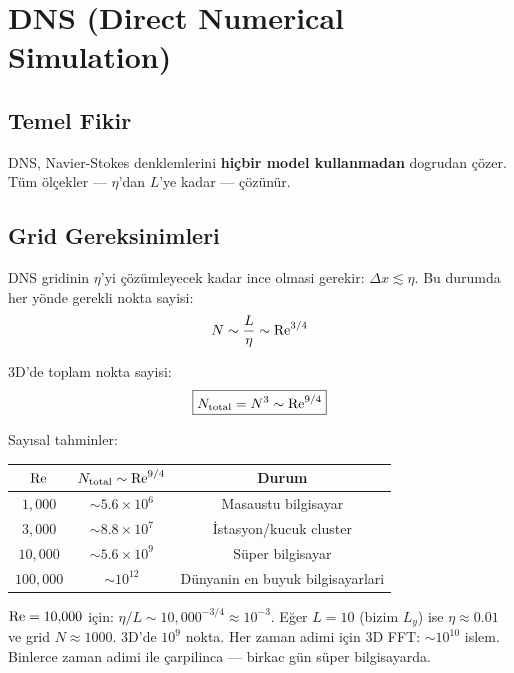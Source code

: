 \section{DNS (Direct Numerical Simulation)}
\label{sec:dns}

\subsection{Temel Fikir}

DNS, Navier-Stokes denklemlerini \textbf{hiçbir model kullanmadan} dogrudan çözer. Tüm ölçekler --- $\eta$'dan $L$'ye kadar --- çözünür.

\subsection{Grid Gereksinimleri}

DNS gridinin $\eta$'yi çözümleyecek kadar ince olmasi gerekir: $\Delta x \lesssim \eta$. Bu durumda her yönde gerekli nokta sayisi:
\begin{equation}
N \sim \frac{L}{\eta} \sim \mathrm{Re}^{3/4}
\end{equation}

3D'de toplam nokta sayisi:
\begin{equation}
\boxed{N_{\text{total}} = N^3 \sim \mathrm{Re}^{9/4}}
\label{eq:dns_cost}
\end{equation}

\begin{example}
Say\i{}sal tahminler:
\begin{center}
\begin{tabular}{ccc}
\toprule
$\mathrm{Re}$ & $N_{\text{total}} \sim \mathrm{Re}^{9/4}$ & Durum \\
\midrule
$1{,}000$ & $\sim 5.6\times10^6$ & Masaustu bilgisayar \\
$3{,}000$ & $\sim 8.8\times10^7$ & İstasyon/kucuk cluster \\
$10{,}000$ & $\sim 5.6\times10^9$ & Süper bilgisayar \\
$100{,}000$ & $\sim 10^{12}$ & Dünyanin en buyuk bilgisayarlari \\
\bottomrule
\end{tabular}
\end{center}

$\mathrm{Re} = 10{,}000$ için: $\eta / L \sim 10{,}000^{-3/4} \approx 10^{-3}$. Eğer $L = 10$ (bizim $L_y$) ise $\eta \approx 0.01$ ve grid $N \approx 1000$. 3D'de $10^9$ nokta. Her zaman adimi için 3D FFT: $\sim 10^{10}$ islem. Binlerce zaman adimi ile çarpilinca --- birkac gün süper bilgisayarda.
\end{example}

